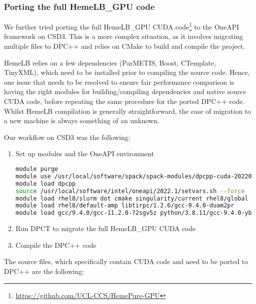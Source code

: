 \documentclass[../main]{subfiles}
\begin{document}
\subsubsection{Porting the full HemeLB\_GPU code}
We further tried porting the full HemeLB\_GPU CUDA code\footnote{\url{https://github.com/UCL-CCS/HemePure-GPU}} to the OneAPI framework on CSD3.
This is a more complex situation, as it involves migrating multiple files to DPC++ and relies on CMake to build and compile the project.

HemeLB relies on a few dependencies (ParMETIS, Boost, CTemplate, TinyXML), which need to be installed prior to compiling the source code.
Hence, one issue that needs to be resolved to ensure fair performance comparison is having the right modules for building/compiling dependencies and native source CUDA code, before repeating the same procedure for the ported DPC++ code.
Whilst HemeLB compilation is generally straightforward, the ease of migration to a new machine is always something of an unknown.

Our workflow on CSD3 was the following:
\begin{enumerate}
	\item Set up modules and the OneAPI environment
	      \begin{lstlisting}[language=bash,basicstyle=\scriptsize\ttfamily]
module purge
module use /usr/local/software/spack/spack-modules/dpcpp-cuda-20220220/linux-centos8-x86_64_v3/
module load dpcpp
source /usr/local/software/intel/oneapi/2022.1/setvars.sh --force
module load rhel8/slurm dot cmake singularity/current rhel8/global cuda/11.4
module load rhel8/default-amp libtirpc/1.2.6/gcc-9.4.0-duam2pr
module load gcc/9.4.0/gcc-11.2.0-72sgv5z python/3.8.11/gcc-9.4.0-yb6rzr6
    \end{lstlisting}
	\item Run DPCT to migrate the full HemeLB\_GPU CUDA code
	\item Compile the DPC++ code
\end{enumerate}


The source files, which specifically contain CUDA code and need to be ported to DPC++ are the following:

\end{document}
